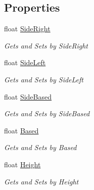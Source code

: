 \subsection*{Properties}
\begin{DoxyCompactItemize}
\item 
float \hyperlink{class_calcular_perimetro_figura_1_1_triangule_a157c5ff0a52ca511f4f7ea6ed0aaf7d1}{Side\+Right}
\begin{DoxyCompactList}\small\item\em Gets and Sets by Side\+Right \end{DoxyCompactList}\item 
float \hyperlink{class_calcular_perimetro_figura_1_1_triangule_acce850765f116bbe94c5fb1a775ad6d8}{Side\+Left}
\begin{DoxyCompactList}\small\item\em Gets and Sets by Side\+Left \end{DoxyCompactList}\item 
float \hyperlink{class_calcular_perimetro_figura_1_1_triangule_a2c9f3eb7675f21be2242cfd98040d11d}{Side\+Based}
\begin{DoxyCompactList}\small\item\em Gets and Sets by Side\+Based \end{DoxyCompactList}\item 
float \hyperlink{class_calcular_perimetro_figura_1_1_triangule_a949cca24ed5adf5856486c509dd66597}{Based}
\begin{DoxyCompactList}\small\item\em Gets and Sets by Based \end{DoxyCompactList}\item 
float \hyperlink{class_calcular_perimetro_figura_1_1_triangule_a63a3f79718887a87d1dd5b5f1ce0ca9d}{Height}
\begin{DoxyCompactList}\small\item\em Gets and Sets by Height \end{DoxyCompactList}\end{DoxyCompactItemize}



